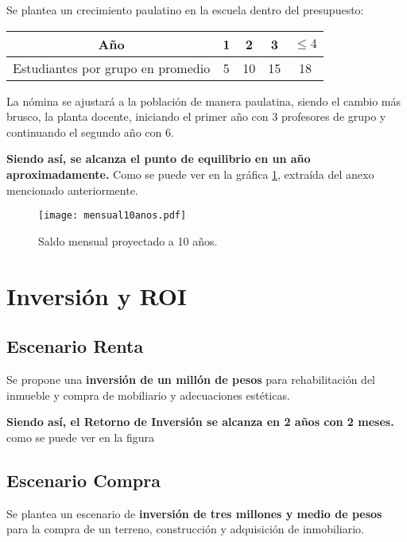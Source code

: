 \documentclass[10pt,letterpaper,oneside]{book}
\begin{document}
Se plantea un crecimiento paulatino en la escuela dentro del presupuesto:
\begin{center}
\begin{tabular}{|c|c|c|c|c|}
\hline 
Año & 1 & 2 & 3 & $\leq 4$ \\ 
\hline 
Estudiantes por grupo en promedio & 5 & 10 & 15 & 18 \\ 
\hline 
\end{tabular}
\end{center} 

La nómina se ajustará a la población de manera paulatina, siendo el cambio más brusco, la planta docente, iniciando el primer año con 3 profesores de grupo y continuando el segundo año con 6.

\vspace{0.3cm}
{\bf\large \color{red} Siendo así, se alcanza el punto de equilibrio en un año aproximadamente.} Como se puede ver en la gráfica \ref{mensualProyeccion}, extraída del anexo mencionado anteriormente.

\begin{figure}[h]
\begin{center}
\texttt{[image: mensual10anos.pdf]}
\caption{Saldo mensual proyectado a 10 años.}
\label{mensualProyeccion}
\end{center}
\end{figure}

\section{Inversión y ROI}
\subsection{Escenario Renta}
Se propone una {\bf inversión de un millón de pesos} para rehabilitación del inmueble y compra de mobiliario y adecuaciones estéticas.

\vspace{0.2cm}
{\bf\large \color{red} Siendo así, el Retorno de Inversión se alcanza en 2 años con 2 meses.} como se puede ver en la figura 



\subsection{Escenario Compra}
Se plantea un escenario de {\bf inversión de tres millones y medio de pesos} para la compra de un terreno, construcción y adquisición de inmobiliario.
\end{document}
